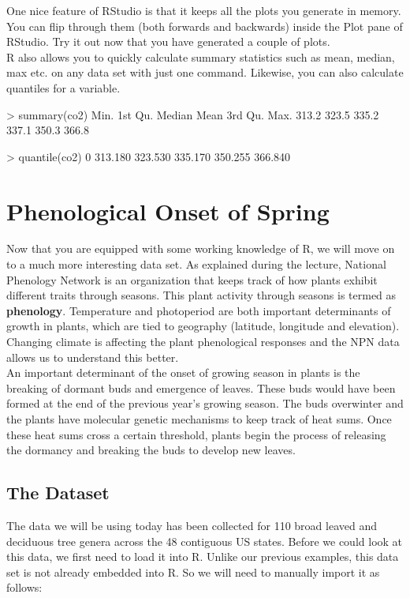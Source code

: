 \documentclass[11pt,twosided]{article}
\begin{document}
One nice feature of RStudio is that it keeps all the plots you generate in memory.  You can flip through them (both forwards and backwards) inside the Plot pane of RStudio.  Try it out now that you have generated a couple of plots.\\

R also allows you to quickly calculate summary statistics such as mean, median, max etc. on any data set with just one command.  Likewise, you can also calculate quantiles for a variable.  \\

\begin{tcolorbox}[breakable,boxrule=0.5pt,enhanced]
\begin{code}
> summary(co2)
   Min. 1st Qu.  Median    Mean 3rd Qu.    Max. 
  313.2   323.5   335.2   337.1   350.3   366.8 

> quantile(co2)
     0%
313.180 323.530 335.170 350.255 366.840 
\end{code}
\end{tcolorbox}

\newpage
\section{Phenological Onset of Spring}

Now that you are equipped with some working knowledge of R, we will move on to a much more interesting data set.  As explained during the lecture, National Phenology Network is an organization that keeps track of how plants exhibit different traits through seasons.  This plant activity through seasons is termed as {\bf phenology}.  Temperature and photoperiod are both important determinants of growth in plants, which are tied to geography (latitude, longitude and elevation).  Changing climate is affecting the plant phenological responses and the NPN data allows us to understand this better.\\

An important determinant of the onset of growing season in plants is the breaking of dormant buds and emergence of leaves. These buds would have been formed at the end of the previous year's growing season.  The buds overwinter and the plants have molecular genetic mechanisms to keep track of heat sums.  Once these heat sums cross a certain threshold, plants begin the process of releasing the dormancy and breaking the buds to develop new leaves.

\subsection{The Dataset}
The data we will be using today has been collected for 110 broad leaved and deciduous tree genera across the 48 contiguous US states.  Before we could look at this data, we first need to load it into R.  Unlike our previous examples, this data set is not already embedded into R.  So we will need to manually import it as follows:\\
\end{document}

